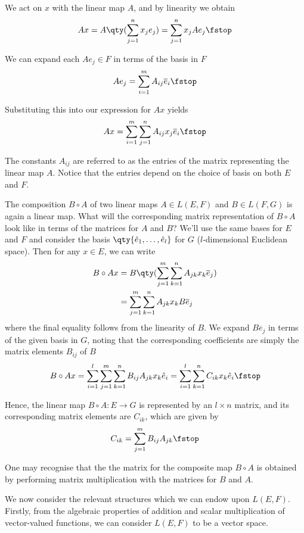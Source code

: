  We act on \( x \) with the linear map \( A \), and by linearity we obtain
 \[ Ax=A\qty(\sum_{j=1}^nx_je_j)=\sum_{j=1}^nx_jAe_j\fstop \]

 We can expand each \( Ae_j\in F \) in terms of the basis in \( F \)
 \[ Ae_j=\sum_{i=1}^mA_{ij}\overline{e}_i\fstop \]

 Substituting this into our expression for \( Ax \) yields
 \[ Ax=\sum_{i=1}^m\sum_{j=1}^nA_{ij}x_j\overline{e}_i\fstop\]

 The constants \( A_{ij} \) are referred to as the entries of the matrix representing the linear map \( A \). Notice that the entries depend on the choice of basis on both \( E \) and \( F \).

 \vspace{3mm}

 The composition \( B\circ A \) of two linear maps \( A\in L(E,F) \) and \( B\in L(F,G) \) is again a linear map. What will the corresponding matrix representation of \( B\circ A \) look like in terms of the matrices for \( A \) and \( B \)? We'll use the same bases for \( E \) and \( F \) and consider the basis \( \qty{\hat{e}_1,\dots,\hat{e}_l} \) for \( G \) (\( l \)-dimensional Euclidean space). Then for any \( x\in E \), we can write
 \begin{align*}
   B\circ A x&= B\qty(\sum_{j=1}^m\sum_{k=1}^n A_{jk}x_k\overline{e}_j)\\
   &= \sum_{j=1}^m\sum_{k=1}^n A_{jk}x_kB\overline{e}_j
 \end{align*}
 where the final equality follows from the linearity of \( B \). We expand \( B\overline{e}_j \) in terms of the given basis in \( G \), noting that the corresponding coefficients are simply the matrix elements \( B_{ij} \) of \( B \)
 \[ B\circ Ax=\sum_{i=1}^l\sum_{j=1}^m\sum_{k=1}^nB_{ij}A_{jk}x_k\hat{e}_i=\sum_{i=1}^l\sum_{k=1}^nC_{ik}x_k\hat{e}_i\fstop \]

 Hence, the linear map \( B\circ A:E\to G \) is represented by an \( l\times n \) matrix, and its corresponding matrix elements are \( C_{ik} \), which are given by
 \[ C_{ik}=\sum_{j=1}^mB_{ij}A_{jk}\fstop \]

 One may recognise that the the matrix for the composite map \( B\circ A \) is obtained by performing matrix multiplication with the matrices for \( B \) and \( A \).

 \vspace{3mm}

 We now consider the relevant structures which we can endow upon \( L(E,F) \). Firstly, from the algebraic properties of addition and scalar multiplication of vector-valued functions, we can consider \( L(E,F) \) to be a vector space.
 
